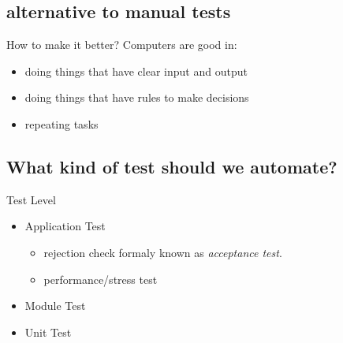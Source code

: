 \documentclass[SoftwareQuality.tex]{subfiles}
\begin{document}
\subsection*{alternative to manual tests}
\begin{frame}{How to make it better?} 
Computers are good in:
\begin{itemize}
	\item  doing things that have clear input and output
	\item  doing things that have rules to make decisions
	\item  repeating tasks
\end{itemize}
\vfill

\vfill

\end{frame}

\subsection*{What kind of test should we automate?}
\begin{frame}{Test Level} 

\begin{itemize}
	\item Application Test
		\begin{itemize}
			\item rejection check {\color{gray}formaly known as \textit{acceptance test}}.
			\item performance/stress test
		\end{itemize}
	\item Module Test
	\item Unit Test
\end{itemize}

\end{frame}
\end{document}

